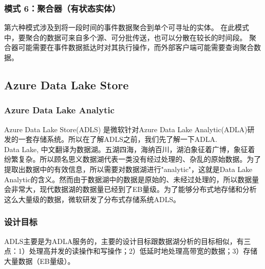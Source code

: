 \documentclass[11pt]{article}
\begin{document}
\subsubsection{模式 6：聚合器（有状态实体）}
第六种模式涉及到将一段时间的事件数据聚合到单个可寻址的实体。 在此模式中，要聚合的数据可来自多个源、可分批传送，也可以分散在较长的时间段。 聚合器可能需要在事件数据抵达时对其执行操作，而外部客户端可能需要查询聚合数据。

\subsection{Azure Data Lake Store}
\subsubsection{Azure Data Lake Analytic}
Azure Data Lake Store(ADLS) 是微软针对Azure Data Lake Analytic(ADLA)研发的一套存储系统。所以在了解ADLS之前，我们先了解一下ADLA.\\
Data Lake, 中文翻译为数据湖。五湖四海，海纳百川，湖泊象征着广博，象征着纷繁复杂。所以顾名思义数据湖代表一类没有经过处理的、杂乱的原始数据。为了提取出数据中的有效信息，所以需要对数据湖进行"analytic"，这就是Data Lake Analytic的含义。然而由于数据湖中的数据是原始的、未经过处理的，所以数据量会非常大，现代数据湖的数据量已经到了EB量级。为了能够分布式地存储和分析这么大量级的数据，微软研发了分布式存储系统ADLS。
\subsubsection{设计目标}
ADLS主要是为ADLA服务的，主要的设计目标跟数据湖分析的目标相似，有三点：1）处理高并发的读操作和写操作；2）低延时地处理高带宽的数据；3）存储大量数据（EB量级）。
\end{document}
